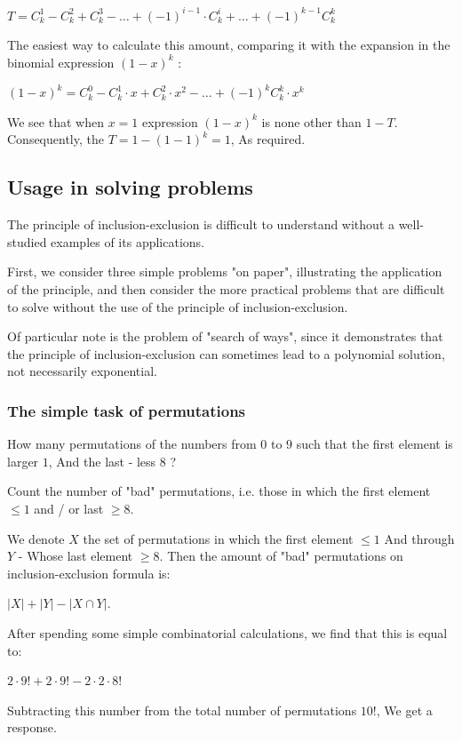 $T=C_{k}^{1}-C_{k}^{2}+C_{k}^{3}-\ldots+(-1)^{i-1}\cdot C_{k}^{i}+\ldots+(-1)^{k-1}C_{k}^{k}$

The easiest way to calculate this amount, comparing it with the expansion in the binomial expression $(1-x) ^ k$ :

$(1-x)^{k}=C_{k}^{0}-C_{k}^{1}\cdot x+C_{k}^{2}\cdot x^{2}-\ldots+(-1)^{k}C_{k}^{k}\cdot x^{k}$

We see that when $x = 1$ expression $(1-x) ^ k$ is none other than $1 - T$. Consequently, the $T = 1 - (1-1) ^ k = 1$, As required.

\subsection{ Usage in solving problems }

The principle of inclusion-exclusion is difficult to understand without a well-studied examples of its applications.

First, we consider three simple problems "on paper", illustrating the application of the principle, and then consider the more practical problems that are difficult to solve without the use of the principle of inclusion-exclusion.

Of particular note is the problem of "search of ways", since it demonstrates that the principle of inclusion-exclusion can sometimes lead to a polynomial solution, not necessarily exponential.

\subsubsection{ The simple task of permutations }

How many permutations of the numbers from $0$ to $9$ such that the first element is larger $1$, And the last - less $8$ ?

Count the number of "bad" permutations, i.e. those in which the first element $\le 1$ and / or last $\ge 8$.

We denote $X$ the set of permutations in which the first element $\le 1$ And through $Y$ - Whose last element $\ge 8$. Then the amount of "bad" permutations on inclusion-exclusion formula is:

$| X | + | Y | - | X \cap Y |.$

After spending some simple combinatorial calculations, we find that this is equal to:

$2 \cdot 9! + 2 \cdot 9! - 2 \cdot 2 \cdot 8!$

Subtracting this number from the total number of permutations $10!$, We get a response.

